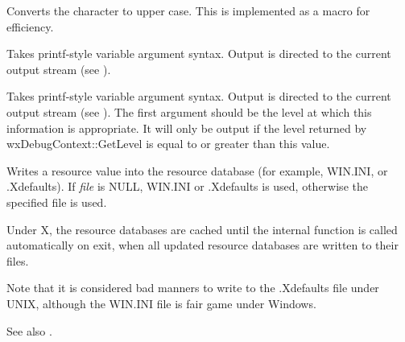 
Converts the character to upper case. This is implemented as a macro for efficiency.

\label{wxtrace}


Takes printf-style variable argument syntax. Output
is directed to the current output stream (see ).

\label{wxtracelevel}


Takes printf-style variable argument syntax. Output
is directed to the current output stream (see ).
The first argument should be the level at which this information is appropriate.
It will only be output if the level returned by wxDebugContext::GetLevel is equal to or greater than
this value.

\label{wxwriteresource}





Writes a resource value into the resource database (for example, WIN.INI, or
.Xdefaults). If {\it file} is NULL, WIN.INI or .Xdefaults is used,
otherwise the specified file is used.

Under X, the resource databases are cached until the internal function
 is called automatically on exit, when
all updated resource databases are written to their files.

Note that it is considered bad manners to write to the .Xdefaults
file under UNIX, although the WIN.INI file is fair game under Windows.

See also .

